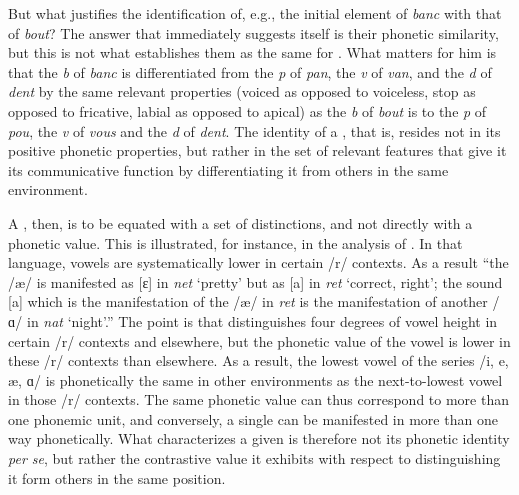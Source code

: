 But what justifies the identification of, e.g., the initial element of
\emph{banc} with that of \emph{bout}? The answer that immediately
suggests itself is their phonetic similarity, but this is not what
establishes them as the same  for {\Martinet}. What matters for
him is that the \emph{b} of \emph{banc} is differentiated from the
\emph{p} of \emph{pan}, the \emph{v} of \emph{van}, and the \emph{d}
of \emph{dent} by the same relevant properties (voiced as opposed to
voiceless, stop as opposed to fricative, labial as opposed to apical)
as the \emph{b} of \emph{bout} is to the \emph{p} of \emph{pou}, the
\emph{v} of \emph{vous} and the \emph{d} of \emph{dent}. The identity
of a , that is, resides not in its positive phonetic
properties, but rather in the set of relevant features that give it
its communicative function by differentiating it from others in the
same environment.

A , then, is to be equated with a set of distinctions, and not
directly with a phonetic value. This is illustrated, for instance, in
the analysis of . In that language, vowels are systematically
lower in certain /r/ contexts. As a result \citep[60]{martinet64:elements}
``the  /æ/ is manifested as {[ɛ]} in \emph{net} `pretty' but as
{[a]} in \emph{ret} `correct, right'; the sound {[a]} which is the
manifestation of the  /æ/ in \emph{ret} is the manifestation of
another  /ɑ/ in \emph{nat} `night'.'' The point is that  distinguishes four
degrees of vowel height in certain /r/ contexts and elsewhere, but the
phonetic value of the vowel is lower in these /r/ contexts than
elsewhere. As a result, the lowest vowel of the series /i, e, æ, ɑ/ is
phonetically the same in other environments as the next-to-lowest
vowel in those /r/ contexts. The same phonetic value can thus
correspond to more than one phonemic unit, and conversely, a single
 can be manifested in more than one way phonetically. What
characterizes a given  is therefore not its phonetic identity
\emph{per se}, but rather the contrastive value it exhibits with
respect to  distinguishing it form others in the same
position.

